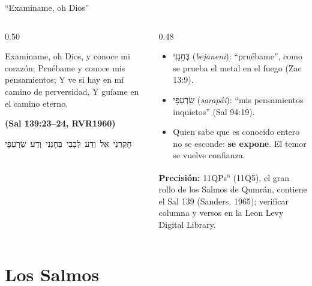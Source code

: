 \documentclass[hyperref={bookmarks=false},aspectratio=169]{beamer}
\newcommand{\heb}[1]{\mbox{\foreignlanguage{hebrew}{#1}}}
\newcommand{\fuente}[1]{\par\hfill{\upshape\bfseries\footnotesize\textcolor{azul}{#1}}}
\newcommand{\destacar}[1]{\textbf{\textcolor{azul}{#1}}}
\newcommand{\precision}[1]{{\footnotesize\color{gris}\textbf{Precisión:} #1}}
\begin{document}
\begin{frame}{``Examíname, oh Dios''}
\begin{columns}[c,onlytextwidth]
\begin{column}{0.50\textwidth}
\begin{cita}Examíname, oh Dios, y conoce mi corazón; Pruébame y conoce mis pensamientos; Y ve si hay en mí camino de perversidad, Y guíame en el camino eterno.\fuente{(Sal 139:23--24, RVR1960)}\end{cita}
\begin{center}\heb{חָקְרֵנִי אֵל וְדַע לְבָבִי בְּחָנֵנִי וְדַע שַׂרְעַפָּי}\end{center}
\end{column}
\begin{column}{0.48\textwidth}\small
\begin{itemize}
\item \heb{בְּחָנֵנִי} (\emph{bejaneni}): ``pruébame'', como se prueba el metal en el fuego (Zac 13:9).
\item \heb{שַׂרְעַפָּי} (\emph{sarapái}): ``mis pensamientos inquietos'' (Sal 94:19).
\item Quien sabe que es conocido entero no se esconde: \destacar{se expone}. El temor se vuelve confianza.
\end{itemize}
\precision{11QPs\textsuperscript{a} (11Q5), el gran rollo de los Salmos de Qumrán, contiene el Sal 139 (Sanders, 1965); verificar columna y versos en la Leon Levy Digital Library.}
\end{column}
\end{columns}
\end{frame}

\section{Los Salmos}
\end{document}
